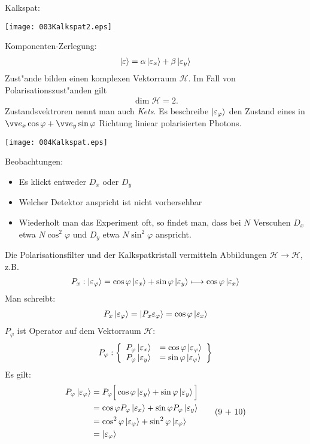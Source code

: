 \documentclass[a4paper]{scrartcl}
\begin{document}
{Kalkspat:
\begin{center}
\texttt{[image: 003Kalkspat2.eps]}
\end{center}
Komponenten-Zerlegung:
\begin{align}
\Ket{ \varepsilon } = \alpha \Ket{ \varepsilon_x } + \beta \Ket{ \varepsilon_y}
\end{align}
Zust"ande bilden einen komplexen Vektorraum $\mathcal H$. Im Fall von Polarisationszust"anden gilt 
\begin{align}
\dim \mathcal{H} = 2.
\end{align}Zustandsvektroren nennt man auch \emph{Kets}. Es beschreibe $\Ket{ \varepsilon_\varphi }$ den Zustand eines in $\vv e_x \cos \varphi + \vv e_y \sin \varphi$ Richtung liniear polarisierten Photons.
\begin{center}
\texttt{[image: 004Kalkspat.eps]}
\end{center}
Beobachtungen:
\begin{itemize}
\item Es klickt entweder $D_x$ oder $D_y$
\item Welcher Detektor anspricht ist nicht vorhersehbar
\item Wiederholt man das Experiment oft, so findet man, dass bei $N$ Verscuhen $D_x$ etwa $N \cos^2 \varphi$ und $D_y$ etwa $N \sin^2\varphi$ anspricht.
\end{itemize}
Die Polarisationsfilter und der Kalkspatkristall vermitteln Abbildungen $\mathcal H \longrightarrow \mathcal H$, z.B.
\begin{align}
P_x: \Ket{ \varepsilon_\varphi } = \cos \varphi \Ket{ \varepsilon_x } + \sin \varphi \Ket{ \varepsilon_y } \longmapsto \cos \varphi \Ket{ \varepsilon_x }
\end{align}
Man schreibt:
\begin{align}
P_x \Ket{\varepsilon_\varphi } = \Ket{ P_x \varepsilon_\varphi} = \cos \varphi \Ket{ \varepsilon_x }
\end{align}
$P_\varphi$ ist Operator auf dem Vektorraum $\mathcal H$:
\begin{align}
P_\varphi: 
\left\{ 
\begin{array}{l l}
P_\varphi \Ket{\varepsilon_x } & = \cos \varphi \Ket{\varepsilon_\varphi} \\
P_\varphi \Ket{\varepsilon_y } & = \sin \varphi \Ket{\varepsilon_\varphi} 
\end{array}
\right\}
\end{align}
Es gilt:
\begin{align}
\begin{split}
P_\varphi \Ket{ \varepsilon_\varphi} & = P_\varphi \Big[ \cos \varphi \Ket{ \varepsilon_y } + \sin \varphi \Ket{ \varepsilon_y } \Big]  \\
& =  \cos \varphi P_\varphi \Ket{ \varepsilon_x } + \sin \varphi P_\varphi \Ket{ \varepsilon_y }  \\
& = \cos^2\varphi \Ket{\varepsilon_\varphi } + \sin^2 \varphi \Ket{ \varepsilon_\varphi }  \\
& = \Ket{ \varepsilon_\varphi } 
\end{split} \tag{9 + 10} 
\end{align}

}
\end{document}
